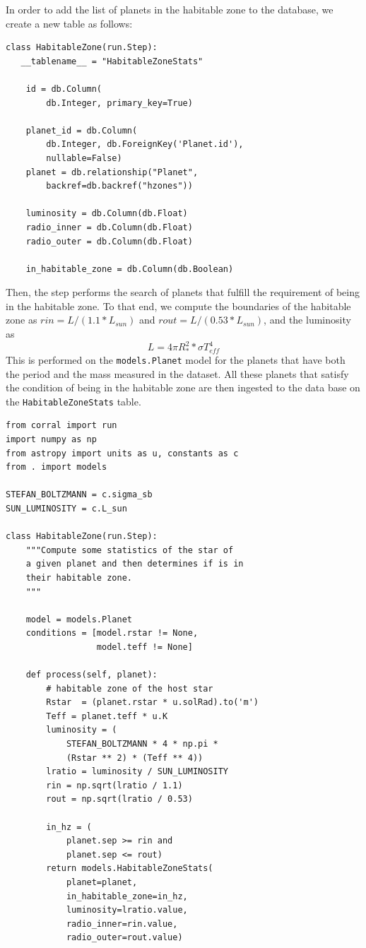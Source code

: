 \documentclass[final,5p,times,twocolumn,authoryear]{elsarticle}
\begin{document}
In order to add the list of planets in the habitable zone to the database, we create a new table as follows:

\begin{verbatim}
class HabitableZone(run.Step):
   __tablename__ = "HabitableZoneStats"

    id = db.Column(
        db.Integer, primary_key=True)

    planet_id = db.Column(
        db.Integer, db.ForeignKey('Planet.id'),
        nullable=False)
    planet = db.relationship("Planet",
        backref=db.backref("hzones"))

    luminosity = db.Column(db.Float)
    radio_inner = db.Column(db.Float)
    radio_outer = db.Column(db.Float)

    in_habitable_zone = db.Column(db.Boolean)
\end{verbatim}

Then, the step performs the search of planets that fulfill the requirement of being in the habitable zone.
%
To that end, we compute the boundaries of the habitable zone as $rin=L/(1.1*L_{sun})$ and $rout=L/(0.53*L_{sun})$, and the luminosity as
%
\begin{equation}
L = 4 \pi R_{\ast}^2 * \sigma T_{eff}^4
\end{equation}
%
This is performed on the \verb|models.Planet| model for the planets
that have both the period and the mass measured
in the dataset.
%
All these planets that satisfy the condition of being in the habitable zone
are then ingested to the data base on the \verb|HabitableZoneStats| table.

\begin{verbatim}
from corral import run
import numpy as np
from astropy import units as u, constants as c
from . import models

STEFAN_BOLTZMANN = c.sigma_sb
SUN_LUMINOSITY = c.L_sun

class HabitableZone(run.Step):
    """Compute some statistics of the star of
    a given planet and then determines if is in
    their habitable zone.
    """

    model = models.Planet
    conditions = [model.rstar != None,
                  model.teff != None]

    def process(self, planet):
        # habitable zone of the host star
        Rstar  = (planet.rstar * u.solRad).to('m')
        Teff = planet.teff * u.K
        luminosity = (
            STEFAN_BOLTZMANN * 4 * np.pi *
            (Rstar ** 2) * (Teff ** 4))
        lratio = luminosity / SUN_LUMINOSITY
        rin = np.sqrt(lratio / 1.1)
        rout = np.sqrt(lratio / 0.53)

        in_hz = (
            planet.sep >= rin and
            planet.sep <= rout)
        return models.HabitableZoneStats(
            planet=planet,
            in_habitable_zone=in_hz,
            luminosity=lratio.value,
            radio_inner=rin.value,
            radio_outer=rout.value)
\end{verbatim}
\end{document}
